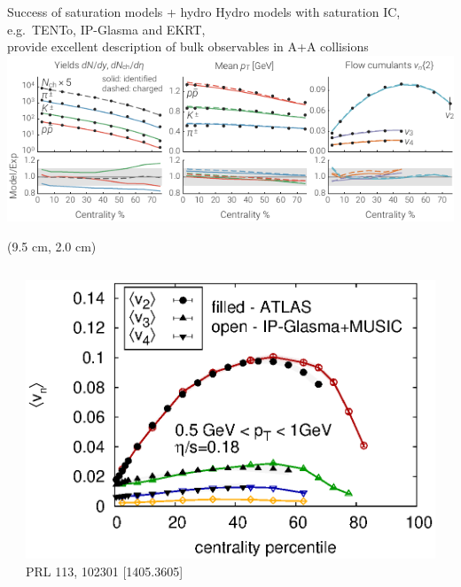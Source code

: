 \documentclass{beamer}
\newcommand{\trento}{T\raisebox{-0.3ex}{R}ENTo}
\begin{document}
\begin{frame}[plain]{Success of saturation models + hydro}
  \centering
  \medskip
  \scriptsize Hydro models with saturation IC, e.g.\ \trento, IP-Glasma and EKRT,\\
  provide excellent description of bulk observables in A+A collisions \\[1ex]
  \includegraphics[width=.8\textwidth]{mode_observables} \\[1ex]
  \begin{textblock*}{0.3\textwidth}(9.5 cm, 2.0 cm)
  \end{textblock*}
  \begin{columns}
    \begin{column}{.075\textwidth}
    \end{column}
    \begin{column}{.45\textwidth}
      \centering
      \includegraphics[width=\columnwidth]{vn_ipglasma.eps} \\
      {\tiny PRL 113, 102301 [1405.3605]}
    \end{column}
    \begin{column}{.4\textwidth}
      \centering

\end{column}
\end{columns}
\end{frame}
\end{document}

